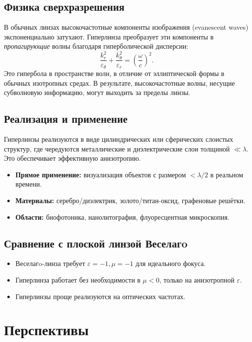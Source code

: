 \documentclass[a4paper,12pt]{article}
\begin{document}
\subsection*{Физика сверхразрешения}
В обычных линзах высокочастотные компоненты изображения (evanescent waves) экспоненциально затухают. Гиперлинза преобразует эти компоненты в \textit{пропагирующие} волны благодаря гиперболической дисперсии:
\begin{equation}
    \frac{k_r^2}{\varepsilon_\theta} + \frac{k_\theta^2}{\varepsilon_r} = \left(\frac{\omega}{c}\right)^2.
\end{equation}
Это гипербола в пространстве волн, в отличие от эллиптической формы в обычных изотропных средах. В результате, высокочастотные волны, несущие субволновую информацию, могут выходить за пределы линзы.

\subsection*{Реализация и применение}
Гиперлинзы реализуются в виде цилиндрических или сферических слоистых структур, где чередуются металлические и диэлектрические слои толщиной $\ll \lambda$. Это обеспечивает эффективную анизотропию.

\begin{itemize}
    \item \textbf{Прямое применение:} визуализация объектов с размером $< \lambda/2$ в реальном времени.
    \item \textbf{Материалы:} серебро/диэлектрик, золото/титан-оксид, графеновые решётки.
    \item \textbf{Области:} биофотоника, нанолитография, флуоресцентная микроскопия.
\end{itemize}

\subsection*{Сравнение с плоской линзой Веселагo}
\begin{itemize}
    \item Веселагo-линза требует $\varepsilon = -1, \mu = -1$ для идеального фокуса.
    \item Гиперлинза работает без необходимости в $\mu < 0$, только на анизотропной $\varepsilon$.
    \item Гиперлинзы проще реализуются на оптических частотах.
\end{itemize}

\section*{Перспективы}
\end{document}
